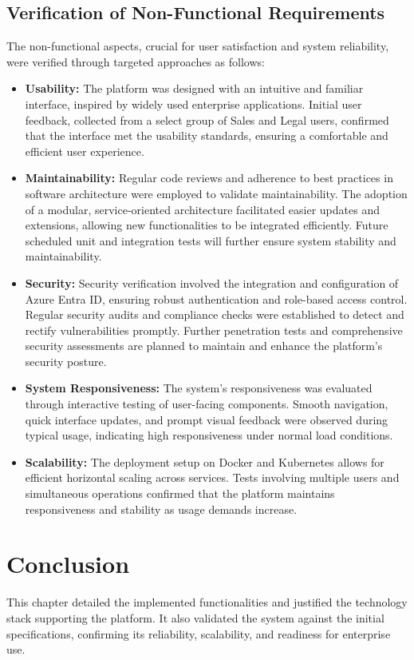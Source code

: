 \subsection{Verification of Non-Functional Requirements}
The non-functional aspects, crucial for user satisfaction and system reliability, were verified through targeted approaches as follows:


\begin{itemize}
    \item \textbf{Usability:} The platform was designed with an intuitive and familiar interface, inspired by widely used enterprise applications. Initial user feedback, collected from a select group of Sales and Legal users, confirmed that the interface met the usability standards, ensuring a comfortable and efficient user experience.
    \item \textbf{Maintainability:} Regular code reviews and adherence to best practices in software architecture were employed to validate maintainability. The adoption of a modular, service-oriented architecture facilitated easier updates and extensions, allowing new functionalities to be integrated efficiently. Future scheduled unit and integration tests will further ensure system stability and maintainability.
    \item \textbf{Security:} Security verification involved the integration and configuration of Azure Entra ID, ensuring robust authentication and role-based access control. Regular security audits and compliance checks were established to detect and rectify vulnerabilities promptly. Further penetration tests and comprehensive security assessments are planned to maintain and enhance the platform's security posture.
    \item \textbf{System Responsiveness:} The system’s responsiveness was evaluated through interactive testing of user-facing components. Smooth navigation, quick interface updates, and prompt visual feedback were observed during typical usage, indicating high responsiveness under normal load conditions.
    \item \textbf{Scalability:} The deployment setup on Docker and Kubernetes allows for efficient horizontal scaling across services. Tests involving multiple users and simultaneous operations confirmed that the platform maintains responsiveness and stability as usage demands increase.
\end{itemize}

\section{Conclusion}
This chapter detailed the implemented functionalities and justified the technology stack supporting the platform. It also validated the system against the initial specifications, confirming its reliability, scalability, and readiness for enterprise use.

